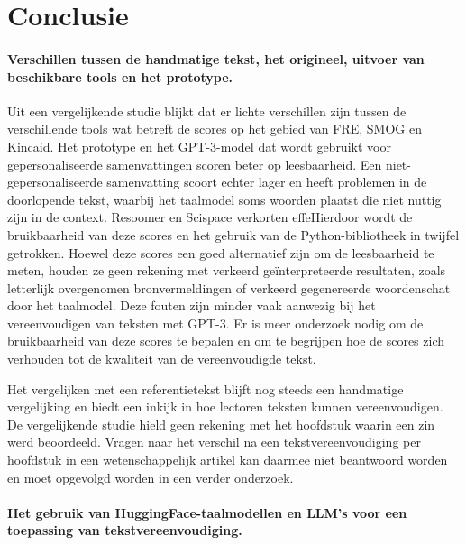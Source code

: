 
\chapter{Conclusie}%
\label{ch:conclusie}

\subsubsection{Verschillen tussen de handmatige tekst, het origineel, uitvoer van beschikbare tools en het prototype.}

Uit een vergelijkende studie blijkt dat er lichte verschillen zijn tussen de verschillende tools wat betreft de scores op het gebied van FRE, SMOG en Kincaid. Het prototype en het GPT-3-model dat wordt gebruikt voor gepersonaliseerde samenvattingen scoren beter op leesbaarheid. Een niet-gepersonaliseerde samenvatting scoort echter lager en heeft problemen in de doorlopende tekst, waarbij het taalmodel soms woorden plaatst die niet nuttig zijn in de context. Resoomer en Scispace verkorten effeHierdoor wordt de bruikbaarheid van deze scores en het gebruik van de Python-bibliotheek in twijfel getrokken. Hoewel deze scores een goed alternatief zijn om de leesbaarheid te meten, houden ze geen rekening met verkeerd geïnterpreteerde resultaten, zoals letterlijk overgenomen bronvermeldingen of verkeerd gegenereerde woordenschat door het taalmodel. Deze fouten zijn minder vaak aanwezig bij het vereenvoudigen van teksten met GPT-3. Er is meer onderzoek nodig om de bruikbaarheid van deze scores te bepalen en om te begrijpen hoe de scores zich verhouden tot de kwaliteit van de vereenvoudigde tekst. 

\medspace

Het vergelijken met een referentietekst blijft nog steeds een handmatige vergelijking en biedt een inkijk in hoe lectoren teksten kunnen vereenvoudigen. De vergelijkende studie hield geen rekening met het hoofdstuk waarin een zin werd beoordeeld. Vragen naar het verschil na een tekstvereenvoudiging per hoofdstuk in een wetenschappelijk artikel kan daarmee niet beantwoord worden en moet opgevolgd worden in een verder onderzoek.

\subsubsection{Het gebruik van HuggingFace-taalmodellen en LLM's voor een toepassing van tekstvereenvoudiging.}

